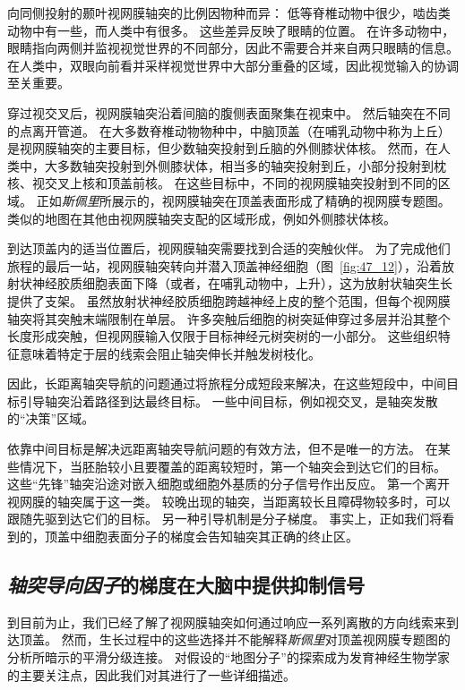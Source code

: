 向同侧投射的颞叶视网膜轴突的比例因物种而异：
低等脊椎动物中很少，啮齿类动物中有一些，而人类中有很多。
这些差异反映了眼睛的位置。
在许多动物中，眼睛指向两侧并监视视觉世界的不同部分，因此不需要合并来自两只眼睛的信息。
在人类中，双眼向前看并采样视觉世界中大部分重叠的区域，因此视觉输入的协调至关重要。


穿过视交叉后，视网膜轴突沿着间脑的腹侧表面聚集在视束中。
然后轴突在不同的点离开管道。
在大多数脊椎动物物种中，中脑顶盖（在哺乳动物中称为上丘）是视网膜轴突的主要目标，但少数轴突投射到丘脑的外侧膝状体核。
然而，在人类中，大多数轴突投射到外侧膝状体，相当多的轴突投射到丘，小部分投射到枕核、视交叉上核和顶盖前核。
在这些目标中，不同的视网膜轴突投射到不同的区域。
正如\textit{斯佩里}所展示的，视网膜轴突在顶盖表面形成了精确的视网膜专题图。
类似的地图在其他由视网膜轴突支配的区域形成，例如外侧膝状体核。


到达顶盖内的适当位置后，视网膜轴突需要找到合适的突触伙伴。
为了完成他们旅程的最后一站，视网膜轴突转向并潜入顶盖神经细胞（图~\ref{fig:47_12}），沿着放射状神经胶质细胞表面下降（或者，在哺乳动物中，上升），这为放射状轴突生长提供了支架。
虽然放射状神经胶质细胞跨越神经上皮的整个范围，但每个视网膜轴突将其突触末端限制在单层。
许多突触后细胞的树突延伸穿过多层并沿其整个长度形成突触，但视网膜输入仅限于目标神经元树突树的一小部分。
这些组织特征意味着特定于层的线索会阻止轴突伸长并触发树枝化。


因此，长距离轴突导航的问题通过将旅程分成短段来解决，在这些短段中，中间目标引导轴突沿着路径到达最终目标。
一些中间目标，例如视交叉，是轴突发散的“决策”区域。


依靠中间目标是解决远距离轴突导航问题的有效方法，但不是唯一的方法。
在某些情况下，当胚胎较小且要覆盖的距离较短时，第一个轴突会到达它们的目标。
这些“先锋”轴突沿途对嵌入细胞或细胞外基质的分子信号作出反应。
第一个离开视网膜的轴突属于这一类。
较晚出现的轴突，当距离较长且障碍物较多时，可以跟随先驱到达它们的目标。
另一种引导机制是分子梯度。
事实上，正如我们将看到的，顶盖中细胞表面分子的梯度会告知轴突其正确的终止区。



\subsection{\textit{轴突导向因子}的梯度在大脑中提供抑制信号}

到目前为止，我们已经了解了视网膜轴突如何通过响应一系列离散的方向线索来到达顶盖。
然而，生长过程中的这些选择并不能解释\textit{斯佩里}对顶盖视网膜专题图的分析所暗示的平滑分级连接。
对假设的“地图分子”的探索成为发育神经生物学家的主要关注点，因此我们对其进行了一些详细描述。


